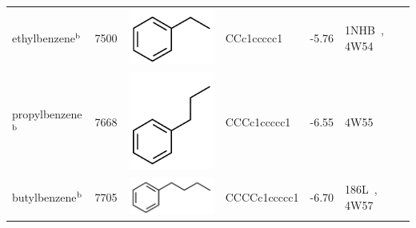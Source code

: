\documentclass[aps,pre,twocolumn,nofootinbib,superscriptaddress,10pt, final,tightenlines]{revtex4-1}
\begin{document}
\begin{table}
\begin{center}
\begin{tabular}{llp{2cm}>{\ttfamily}lS[table-format=-1.2, table-figures-uncertainty=1]ll}
ethylbenzene$^{\rm b}$           & 7500                     &  \parbox[c]{1em}{\includegraphics[scale=0.2]{figures/7500.pdf}}  & CCc1ccccc1             & -5.76                       & 1NHB~\cite{morton_specificity_1995}, 4W54~\cite{merski_homologous_2015} & \cite{morton_energetic_1995}                                 \\ %
propylbenzene$^{\rm b}$          & 7668                     &  \parbox[c]{1em}{\includegraphics[scale=0.2]{figures/7668.pdf}}  & CCCc1ccccc1            & -6.55                       & 4W55~\cite{merski_homologous_2015}                                      & \cite{morton_energetic_1995}                                 \\ %
butylbenzene$^{\rm b}$           & 7705                     &  \parbox[c]{1em}{\includegraphics[scale=0.2]{figures/7705.pdf}}  & CCCCc1ccccc1           & -6.70                       & 186L~\cite{morton_specificity_1995}, 4W57~\cite{merski_homologous_2015} & \cite{morton_energetic_1995}                                 \\%

\end{tabular}
\end{center}
\end{table}
\end{document}
